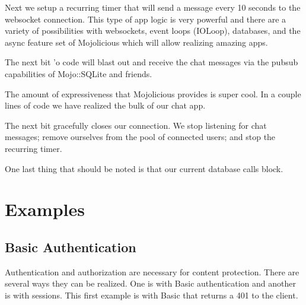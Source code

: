 \documentclass[14pt]{extreport}
\newcommand\Small{\fontsize{12}{13.0}\fontencoding{T1}\selectfont}
\newcommand*\LSTfont{\Small\ttfamily\SetTracking{encoding=*}{-60}\lsstyle}
\begin{document}


Next we setup a recurring timer that will send a message every 10 seconds to
the websocket connection.  This type of app logic is very powerful and there
are a variety of possibilities with websockets, event loops (IOLoop),
databases, and the async feature set of Mojolicious which will allow realizing
amazing apps.



The next bit 'o code will blast out and receive the chat messages via the
pubsub capabilities of Mojo::SQLite and friends.



The amount of expressiveness that Mojolicious provides is super cool.  In a
couple lines of code we have realized the bulk of our chat app.



The next bit gracefully closes our connection.  We stop listening for chat
messages; remove ourselves from the pool of connected users; and stop the
recurring timer.



One last thing that should be noted is that our current database calls block.

\chapter*{Examples}

\section{Basic Authentication}

Authentication and authorization are necessary for content protection.  There
are several ways they can be realized.  One is with Basic authentication and
another is with sessions.  This first example is with Basic that returns a 401
to the client.


\end{document}
